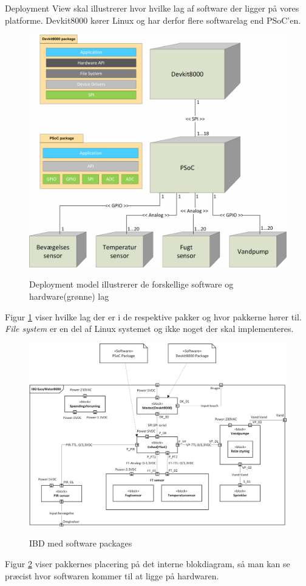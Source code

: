 
Deployment View skal illustrerer hvor hvilke lag af software der ligger på vores platforme. Devkit8000 kører Linux og har derfor flere softwarelag end PSoC'en.
 
\vspace{15 mm}

\begin{figure}[htbp] \centering
{\includegraphics[scale=0.7]{filer/systemarkitektur/Deployment_model}}
\caption{Deployment model illustrerer de forskellige software og hardware(grønne) lag}
\label{fig:Deployment Model}
\end{figure}

Figur \ref{fig:Deployment Model} viser hvilke lag der er i de respektive pakker og hvor pakkerne hører til. \textit{File system} er en del af Linux systemet og ikke noget der skal implementeres.

\clearpage

\begin{figure}[!htbp] \centering
{\includegraphics[scale=0.7]{filer/systemarkitektur/IBD_deployment}}
\caption{IBD med software packages}
\label{fig:IBD deployment}
\end{figure}

Figur \ref{fig:IBD deployment} viser pakkernes placering på det interne blokdiagram, så man kan se præcist hvor softwaren kommer til at ligge på hardwaren.